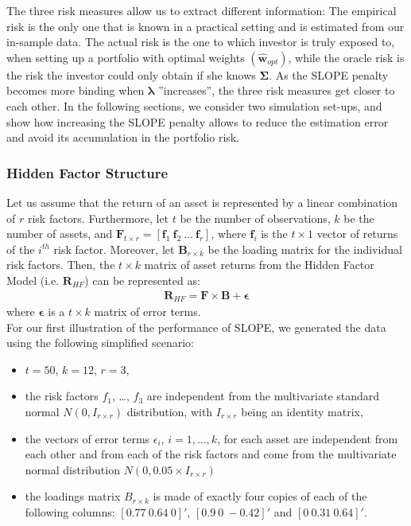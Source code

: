 \documentclass[12pt, a4paper]{article}
\newcommand{\bfw}{\boldsymbol{w} }
\newcommand{\bfSigma}{\boldsymbol{\Sigma} }
\newcommand{\bflambda}{\boldsymbol{\lambda}}
\begin{document}
The three risk measures allow us to extract different information: The empirical risk is the only one that is known in a practical setting and is estimated from our in-sample data. The actual risk is the one to which investor is truly exposed to, when setting up a portfolio with optimal weights $(\hat{\bfw}_{opt})$, while the oracle risk is the risk the investor could only obtain if she knows $\bfSigma$. As the SLOPE penalty becomes more binding when $\bflambda$ ''increases'', the three risk measures get closer to each other. In the following sections, we consider two simulation set-ups, and show how increasing the SLOPE penalty allows to reduce the estimation error and avoid its accumulation in the portfolio risk.

\noindent
\subsubsection*{Hidden Factor Structure}
Let us assume that the return of an asset is represented by a linear combination of $r$ risk factors. Furthermore, let  $t$ be the number of observations, $k$ be the number of assets, and $\boldsymbol{F}_{t \times r} = [\boldsymbol{f}_{1} \  \boldsymbol{f}_{2} \ ...\ \boldsymbol{f}_{r}]$, where $\boldsymbol{f}_{i}$ is the $t \times 1$ vector of returns of the $i^{th}$ risk factor. Moreover, let $\boldsymbol{B}_{r \times k}$ be the loading matrix for the individual risk factors. Then, the $t \times k$ matrix of asset returns from the Hidden Factor Model (i.e. $\boldsymbol{R}_{HF}$) can be represented as:
%
\begin{gather}\label{truemodel}
\boldsymbol{R}_{HF} = \boldsymbol{F} \times \boldsymbol{B} + \boldsymbol{\epsilon}
\end{gather}
%
where $\boldsymbol{\epsilon}$ is a $t \times k$ matrix of error terms.\\
\noindent
For our first illustration of the performance of SLOPE, we generated the data using the following simplified scenario:
\begin{itemize}
\item $t=50$, $k=12$, $r=3$,
\item the risk factors $f_1$, \ldots, $f_3$ are independent from the multivariate standard normal $N(0, I_{r \times r})$ distribution, with $I_{r \times r}$ being an identity matrix,
\item the vectors of error terms $\epsilon_{i}$, $i=1,\ldots,k$, for each asset are independent from each other and from each of the risk factors and come from the multivariate normal distribution $N(0, 0.05\times I_{r\times r})$
\item the loadings matrix $B_{r\times k}$ is made of exactly four copies of each of the following columns: $[0.77\ 0.64\ 0]'$, $[0.9\ 0\ -0.42]'$ and $[0\ 0.31\ 0.64]'$.
\end{itemize}
\end{document}
